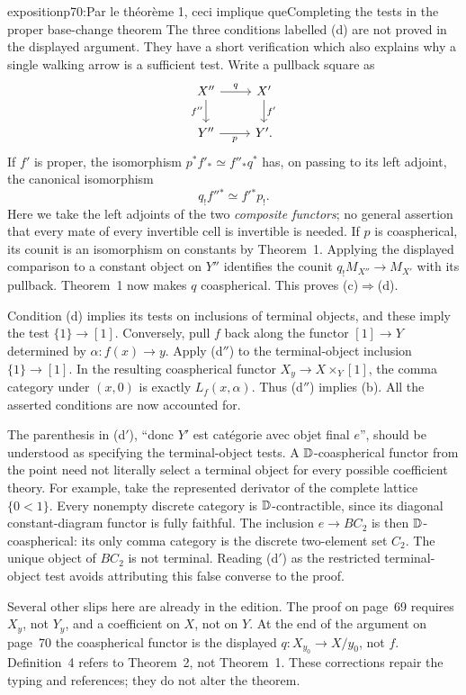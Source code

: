 \begin{dcomment}{exposition}{p70:Par le théorème 1, ceci implique que}{Completing the tests in the proper base-change theorem}
The three conditions labelled (d) are not proved in the displayed argument. They have a short verification which also explains why a single walking arrow is a sufficient test. Write a pullback square as
\[
\begin{tikzcd}
 X''\arrow[r,"q"]\arrow[d,"f''"']&X'\arrow[d,"f'"]\\
 Y''\arrow[r,"p"']&Y'.
\end{tikzcd}
\]
If $f'$ is proper, the isomorphism $p^*f'_*\simeq f''_*q^*$ has, on passing to its left adjoint, the canonical isomorphism
\[
 q_!f''{}^*\simeq f'{}^*p_!.
\]
Here we take the left adjoints of the two \emph{composite functors}; no general assertion that every mate of every invertible cell is invertible is needed. If $p$ is coaspherical, its counit is an isomorphism on constants by Theorem~1. Applying the displayed comparison to a constant object on $Y''$ identifies the counit $q_!M_{X''}\to M_{X'}$ with its pullback. Theorem~1 now makes $q$ coaspherical. This proves (c)$\Rightarrow$(d).

Condition (d) implies its tests on inclusions of terminal objects, and these imply the test $\{1\}\to[1]$. Conversely, pull $f$ back along the functor $[1]\to Y$ determined by $\alpha:f(x)\to y$. Apply (d$''$) to the terminal-object inclusion $\{1\}\to[1]$. In the resulting coaspherical functor $X_y\to X\times_Y[1]$, the comma category under $(x,0)$ is exactly $L_f(x,\alpha)$. Thus (d$''$) implies (b). All the asserted conditions are now accounted for.

The parenthesis in (d$'$), ``donc $Y'$ est catégorie avec objet final $e$'', should be understood as specifying the terminal-object tests. A $\mathbb{D}$-coaspherical functor from the point need not literally select a terminal object for every possible coefficient theory. For example, take the represented derivator of the complete lattice $\{0<1\}$. Every nonempty discrete category is $\mathbb{D}$-contractible, since its diagonal constant-diagram functor is fully faithful. The inclusion $e\to BC_2$ is then $\mathbb{D}$-coaspherical: its only comma category is the discrete two-element set $C_2$. The unique object of $BC_2$ is not terminal. Reading (d$\prime$) as the restricted terminal-object test avoids attributing this false converse to the proof.

Several other slips here are already in the edition. The proof on page~69 requires $X_y$, not $Y_y$, and a coefficient on $X$, not on $Y$. At the end of the argument on page~70 the coaspherical functor is the displayed $q:X_{y_0}\to X/y_0$, not $f$. Definition~4 refers to Theorem~2, not Theorem~1. These corrections repair the typing and references; they do not alter the theorem.
\end{dcomment}


